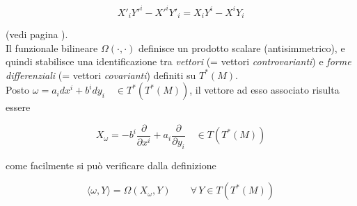 \begin{equation*}
X'_i Y'^i - X'^i Y'_i = X_i Y^i - X^i Y_i
\end{equation*}

(vedi pagina \pageref{pag:7b_fibr_cot}). \\


Il funzionale bilineare $ \Omega(\cdot,\cdot) $ \label{pag:7_fibr_cot} definisce un prodotto scalare (antisimmetrico), e quindi stabilisce una identificazione tra \textit{vettori} (= vettori \textit{controvarianti}) e \textit{forme differenziali} (= vettori \textit{covarianti}) definiti su $T^* (M)$. \\

Posto $ \omega = a_idx^i + b^idy_i \quad \in T^*(T^*(M)) $, il vettore ad esso associato risulta essere

\begin{equation*}
X_\omega = - b^i\frac{\partial}{\partial x^i} + a_i \frac{\partial}{\partial y_i} \quad \in T (T^* (M))
\end{equation*}

come facilmente si può verificare dalla definizione

\begin{equation*}
\langle \omega, Y \rangle = \Omega (X_\omega, Y) \qquad \forall \, Y \in T (T^* (M))
\end{equation*}

\newpage

